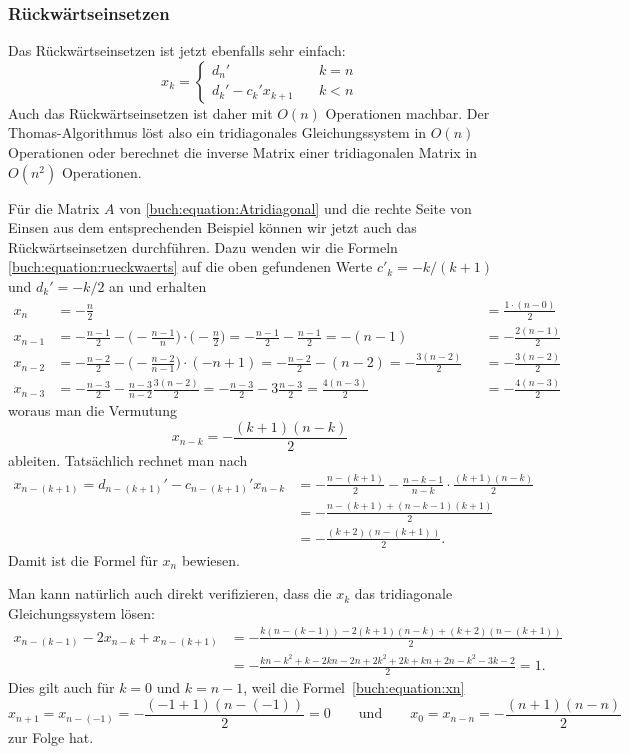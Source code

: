 \subsubsection{Rückwärtseinsetzen}
%
Das Rückwärtseinsetzen ist jetzt ebenfalls sehr einfach:
\begin{equation}
x_k = \begin{cases}
d_n'&\quad k=n
\\
d_k'  - c_k' x_{k+1} &\quad k < n
\end{cases}
\label{buch:equation:rueckwaerts}
\end{equation}
Auch das Rückwärtseinsetzen ist daher mit $O(n)$ Operationen machbar.
Der Thomas-Algorithmus löst also ein tridiagonales Gleichungssystem in
%
$O(n)$ Operationen oder berechnet die inverse Matrix einer 
tridiagonalen Matrix in $O(n^2)$ Operationen.

\begin{beispiel}
Für die Matrix $A$ von \eqref{buch:equation:Atridiagonal} und die rechte
Seite von Einsen aus dem entsprechenden Beispiel  können wir jetzt auch
das Rückwärtseinsetzen durchführen.
Dazu wenden wir die Formeln
\eqref{buch:equation:rueckwaerts}
auf die oben gefundenen Werte $c'_k=-k/(k+1)$ und $d_k'=-k/2$ an und
erhalten
\begin{align*}
x_n
&=
-\frac{n}{2}
&&=\frac{1\cdot (n-0)}2
\\
x_{n-1}
&=
-\frac{n-1}{2} -\biggl(-\frac{n-1}{n}\biggr)\cdot \biggl(-\frac{n}2\biggr)
=
-\frac{n-1}{2} - \frac{n-1}{2}
=
-(n-1)
&&=-\frac{2(n-1)}{2}
\\
x_{n-2}
&=
-\frac{n-2}{2} - \biggl(-\frac{n-2}{n-1}\biggr) \cdot (-n+1)
=
-\frac{n-2}{2} - (n-2)
=
-\frac{3(n-2)}2
&&=-\frac{3(n-2)}2
\\
x_{n-3}
&=
-\frac{n-3}{2} - \frac{n-3}{n-2} \frac{3(n-2)}2
=
-\frac{n-3}{2} - 3\frac{n-3}2
=
\frac{4(n-3)}2
&&=-\frac{4(n-3)}2
\end{align*}
woraus man die Vermutung
\begin{equation}
x_{n-k} = -\frac{(k+1)(n-k)}2
\label{buch:equation:xn}
\end{equation}
ableiten.
Tatsächlich rechnet man nach
\begin{align*}
x_{n-(k+1)}
=
d_{n-(k+1)}'-c_{n-(k+1)}'x_{n-k}
&=
-\frac{n-(k+1)}2-\frac{n-k-1}{n-k}\cdot \frac{(k+1)(n-k)}2
\\
&=
-\frac{n-(k+1)+(n-k-1)(k+1)}2
\\
&=
-\frac{(k+2)(n-(k+1))}2.
\end{align*}
Damit ist die Formel für $x_n$ bewiesen.

Man kann natürlich auch direkt verifizieren, dass die $x_k$ das tridiagonale
Gleichungssystem lösen:
\begin{align*}
x_{n-(k-1)}-2x_{n-k} + x_{n-(k+1)}
&=
-\frac{
k(n-(k-1))
-2(k+1)(n-k)
+(k+2)(n-(k+1))
}2
\\
&=
-\frac{
kn-k^2+k
-2kn-2n+2k^2+2k
+kn+2n-k^2-3k-2}2=1.
\end{align*}
Dies gilt auch für $k=0$  und $k=n-1$, weil die Formel~\eqref{buch:equation:xn}
\[
x_{n+1}=x_{n-(-1)} = -\frac{(-1+1)(n-(-1))}2=0
\qquad\text{und}\qquad
x_0 = x_{n-n} = -\frac{(n+1)(n-n)}2
\]
zur Folge hat.
\end{beispiel}


